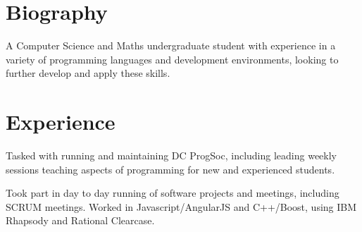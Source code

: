 \documentclass[11pt, a4paper]{cv}
\begin{document}
\begin{minipage}[t]{0.66\textwidth} %

\section{Biography}

A Computer Science and Maths undergraduate student with experience in a variety of programming languages and development environments, looking to further develop and apply these skills.

\sectionspace

\section{Experience}


\vspace{\topsep} %
\begin{tightitemize}
\item Tasked with running and maintaining DC ProgSoc, including leading weekly sessions teaching aspects of programming for new and experienced students.
\end{tightitemize}

\sectionspace



\sectionspace


\vspace{\topsep} %
\begin{tightitemize}
\item Took part in day to day running of software projects and meetings, including SCRUM meetings. Worked in Javascript/AngularJS and C++/Boost, using IBM Rhapsody and Rational Clearcase.
\end{tightitemize}

\sectionspace



\end{minipage}
\end{document}
